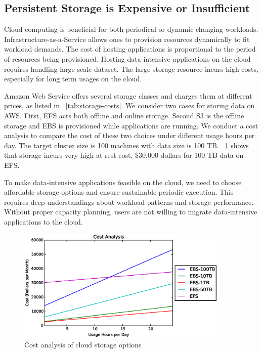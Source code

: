 \subsection{Persistent Storage is Expensive or Insufficient}

Cloud computing is beneficial for both
periodical or dynamic changing workloads.
Infrastructure-as-a-Service allows ones to provision resources dynamically
to fit workload demands.
The cost of hosting applications is proportional to the period of
resources being provisioned.
Hosting data-intensive applications on the cloud requires handling
large-scale dataset.
The large storage resource incurs high costs, especially for
long term usages on the cloud.

Amazon Web Service offers several storage classes and charges them
at different prices, as listed in \mytable~\ref{tab:storage-costs}.
We consider two cases for storing data on AWS.
First, EFS acts both offline and online storage.
Second S3 is the offline storage and
EBS is provisioned while applications are running.
We conduct a cost analysis to compare the cost of these two choices
under different usage hours per day.
The target cluster size is 100 machines with data size is 100 TB.
\myfigure~\ref{fig:cost_analysis} shows that storage incurs very high
at-rest cost, \$30,000 dollars for 100 TB data on EFS.

To make data-intensive applications feasible on the cloud,
we need to choose affordable storage options and
ensure sustainable periodic execution.
This requires deep understandings about workload patterns and storage performance.
Without proper capacity planning, users are not willing to migrate
data-intensive applications to the cloud.

\begin{figure}
    \centering
    \includegraphics[width=0.9\textwidth]{Chapter-8/figures/cost_analysis.eps}
    \caption{Cost analysis of cloud storage options}
    \label{fig:cost_analysis}
\end{figure}


